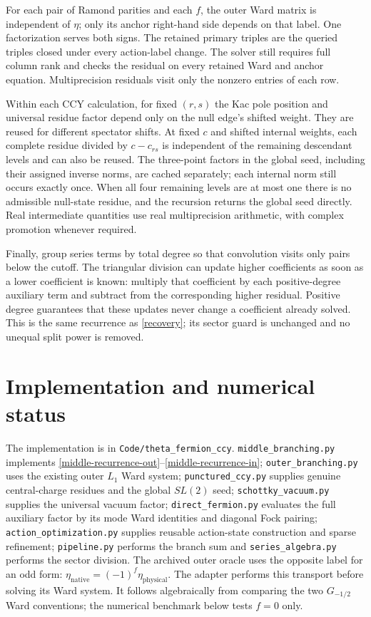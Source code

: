\documentclass[12pt]{article}
\numberwithin{equation}{section}
\begin{document}
For each pair of Ramond parities and each $f$, the outer Ward matrix is
independent of $\eta$; only its anchor right-hand side depends on that
label.  One factorization serves both signs.  The retained primary
triples are the queried triples closed under every action-label change.
The solver still requires full column rank and checks the residual on
every retained Ward and anchor equation.  Multiprecision residuals visit
only the nonzero entries of each row.

Within each CCY calculation, for fixed $(r,s)$ the Kac pole position and
universal residue factor depend only on the null edge's shifted weight.
They are reused for different spectator shifts.  At fixed $c$ and
shifted internal weights, each complete residue divided by $c-c_{rs}$
is independent of the remaining descendant levels and can also be
reused.  The three-point factors in the global seed, including
their assigned inverse norms, are cached separately; each internal norm
still occurs exactly once.  When all four remaining levels are at most
one there is no admissible null-state residue, and the recursion returns
the global seed directly.  Real intermediate quantities use real
multiprecision arithmetic, with complex promotion whenever required.

Finally, group series terms by total degree so that convolution visits
only pairs below the cutoff.  The triangular division can update higher
coefficients as soon as a lower coefficient is known: multiply that
coefficient by each positive-degree auxiliary term and subtract from
the corresponding higher residual.  Positive degree guarantees that
these updates never change a coefficient already solved.  This is the
same recurrence as \eqref{recovery}; its sector guard is unchanged and
no unequal split power is removed.

\section{Implementation and numerical status}

The implementation is in \texttt{Code/theta\_fermion\_ccy}.
\texttt{middle\_branching.py} implements
\eqref{middle-recurrence-out}--\eqref{middle-recurrence-in};
\texttt{outer\_branching.py} uses the existing outer $L_1$ Ward system;
\texttt{punctured\_ccy.py} supplies genuine central-charge residues and
the global $SL(2)$ seed; \texttt{schottky\_vacuum.py} supplies the
universal vacuum factor; \texttt{direct\_fermion.py} evaluates the full
auxiliary factor by its mode Ward identities and diagonal Fock
pairing; \texttt{action\_optimization.py} supplies reusable action-state
construction and sparse refinement; \texttt{pipeline.py} performs the branch sum and
\texttt{series\_algebra.py} performs the sector division.
The archived outer oracle uses the opposite label for an odd form:
$\eta_{\mathrm{native}}=(-1)^f\eta_{\mathrm{physical}}$.  The adapter
performs this transport before solving its Ward system.  It follows
algebraically from comparing the two $G_{-1/2}$ Ward conventions; the
numerical benchmark below tests $f=0$ only.
\end{document}
